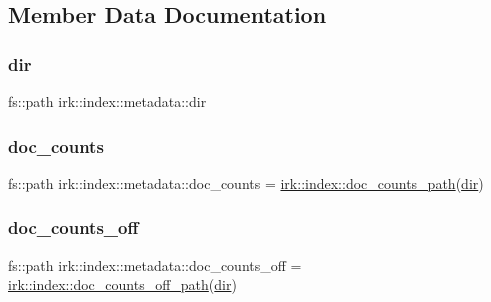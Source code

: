\subsection{Member Data Documentation}
\mbox{\label{structirk_1_1index_1_1metadata_a355b4325c022cd152e68fc18b1775fc6}} 
\subsubsection{\texorpdfstring{dir}{dir}}
{\footnotesize\ttfamily fs\+::path irk\+::index\+::metadata\+::dir}

\mbox{\label{structirk_1_1index_1_1metadata_a1c98d482a721d75186ef3695d22263ea}} 
\subsubsection{\texorpdfstring{doc\+\_\+counts}{doc\_counts}}
{\footnotesize\ttfamily fs\+::path irk\+::index\+::metadata\+::doc\+\_\+counts = \mbox{\hyperlink{namespaceirk_1_1index_aee9cb8e5de7bc61fdc17458d5b597e04}{irk\+::index\+::doc\+\_\+counts\+\_\+path}}(\mbox{\hyperlink{structirk_1_1index_1_1metadata_a355b4325c022cd152e68fc18b1775fc6}{dir}})}

\mbox{\label{structirk_1_1index_1_1metadata_a40270e89d8b3b63d01a2c7da3a3e3748}} 
\subsubsection{\texorpdfstring{doc\+\_\+counts\+\_\+off}{doc\_counts\_off}}
{\footnotesize\ttfamily fs\+::path irk\+::index\+::metadata\+::doc\+\_\+counts\+\_\+off = \mbox{\hyperlink{namespaceirk_1_1index_a5f8f21506f18df93a60b7ff061a800df}{irk\+::index\+::doc\+\_\+counts\+\_\+off\+\_\+path}}(\mbox{\hyperlink{structirk_1_1index_1_1metadata_a355b4325c022cd152e68fc18b1775fc6}{dir}})}

